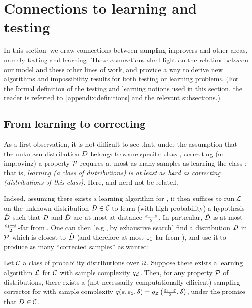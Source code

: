 \section{Connections to learning and testing}\label{sec:connections}
	In this section, we draw connections between sampling improvers and other areas, namely testing and learning. These connections shed light on the relation between our model and these other lines of work, and provide a way to derive new algorithms and impossibility results for both testing or learning problems. (For the formal definition of the testing and learning notions used in this section, the reader is referred to~\cref{appendix:definitions} and the relevant subsections.)

\subsection{From learning to correcting}\label{ssec:connection:learning:approach}As a first observation, it is not difficult to see that, under the assumption that the unknown distribution $D$ belongs to some specific class \class, correcting (or improving) a property $\mathcal{P}$ requires at most as many samples as learning the class \class; that is, \emph{learning (a class of distributions) is at least as hard as correcting (distributions of this class).} Here, \property and \class need not be related.

Indeed, assuming there exists a learning algorithm \Learner for \class, it then suffices to run $\mathcal{L}$ on the unknown distribution $D\in\mathcal{C}$ to learn (with high probability) a hypothesis $\hat{D}$ such that $D$ and $\hat{D}$ are at most at distance $\frac{\varepsilon_1-\varepsilon}{2}$. In particular, $\hat{D}$ is at most $\frac{\varepsilon_1+\varepsilon}{2}$-far from \property. One can then (e.g., by exhaustive search) find a distribution $\tilde{D}$ in $\mathcal{P}$ which is closest to $\hat{D}$ (and therefore at most $\varepsilon_1$-far from \D), and use it to produce as many ``corrected samples'' as wanted:

\begin{theorem}\label{theo:connection:regular:learning}
Let $\mathcal{C}$ a class of probability distributions over ${\Omega}$. Suppose there exists a learning algorithm $\mathcal{L}$ for $\mathcal{C}$ with sample complexity $q_\mathcal{L}$.
Then, for any property $\mathcal{P}$ of distributions, there exists a (not-necessarily computationally efficient) sampling corrector for \property with sample complexity $q(\varepsilon,\varepsilon_1,\delta)=q_\mathcal{L}\left(\frac{\varepsilon_1-\varepsilon}{2},\delta\right)$, under the promise that $D\in\mathcal{C}$.
\end{theorem}

